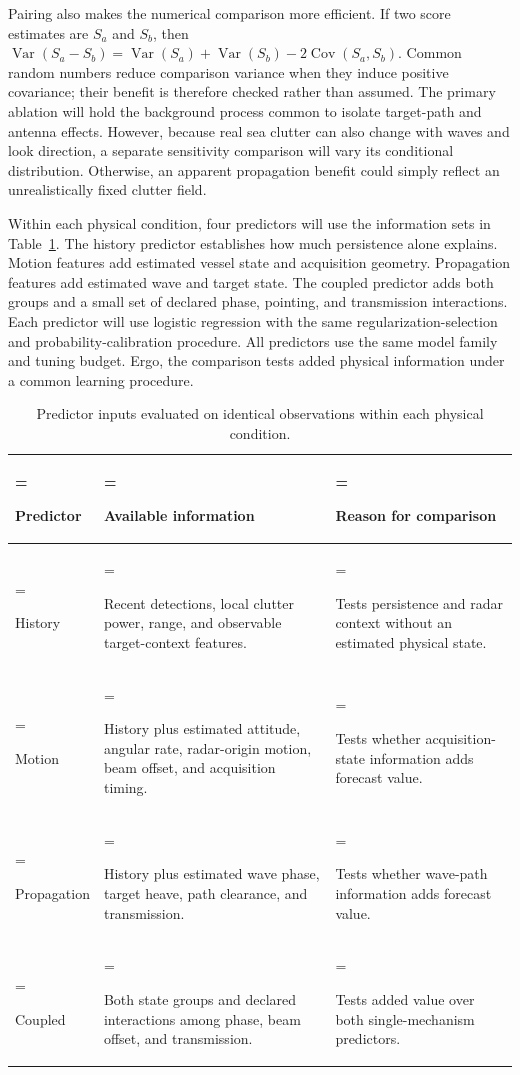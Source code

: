 \documentclass[10pt,letterpaper]{article}
\begin{document}
Pairing also makes the numerical comparison more efficient. If two score estimates are $S_a$ and $S_b$, then $\operatorname{Var}(S_a-S_b)=\operatorname{Var}(S_a)+\operatorname{Var}(S_b)-2\operatorname{Cov}(S_a,S_b)$. Common random numbers reduce comparison variance when they induce positive covariance; their benefit is therefore checked rather than assumed. \cite{Glasserman1992CommonRandomNumbers} The primary ablation will hold the background process common to isolate target-path and antenna effects. However, because real sea clutter can also change with waves and look direction, a separate sensitivity comparison will vary its conditional distribution. Otherwise, an apparent propagation benefit could simply reflect an unrealistically fixed clutter field.

Within each physical condition, four predictors will use the information sets in Table~\ref{tab:predictor-groups}. The history predictor establishes how much persistence alone explains. Motion features add estimated vessel state and acquisition geometry. Propagation features add estimated wave and target state. The coupled predictor adds both groups and a small set of declared phase, pointing, and transmission interactions. Each predictor will use logistic regression with the same regularization-selection and probability-calibration procedure. All predictors use the same model family and tuning budget. Ergo, the comparison tests added physical information under a common learning procedure.

\begin{table}[H]
\centering
\caption{Predictor inputs evaluated on identical observations within each physical condition.}
\label{tab:predictor-groups}
\small
\begin{tabularx}{\textwidth}{@{}>{\hsize=0.6\hsize\linewidth=\hsize\raggedright\arraybackslash}X>{\hsize=1.4\hsize\linewidth=\hsize\raggedright\arraybackslash}X>{\hsize=1.0\hsize\linewidth=\hsize\raggedright\arraybackslash}X@{}}
\toprule
Predictor & Available information & Reason for comparison \\
\midrule
History & Recent detections, local clutter power, range, and observable target-context features. & Tests persistence and radar context without an estimated physical state. \\
Motion & History plus estimated attitude, angular rate, radar-origin motion, beam offset, and acquisition timing. & Tests whether acquisition-state information adds forecast value. \\
Propagation & History plus estimated wave phase, target heave, path clearance, and transmission. & Tests whether wave-path information adds forecast value. \\
Coupled & Both state groups and declared interactions among phase, beam offset, and transmission. & Tests added value over both single-mechanism predictors. \\
\bottomrule
\end{tabularx}
\end{table}
\end{document}
